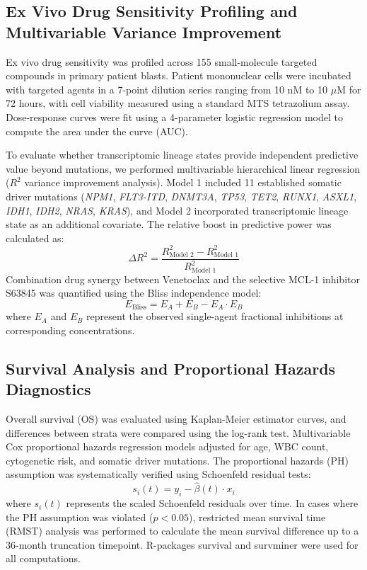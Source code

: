 \documentclass[11pt,a4paper]{article}
\begin{document}
\subsection{Ex Vivo Drug Sensitivity Profiling and Multivariable Variance Improvement}
Ex vivo drug sensitivity was profiled across 155 small-molecule targeted compounds in primary patient blasts. Patient mononuclear cells were incubated with targeted agents in a 7-point dilution series ranging from 10 nM to 10 $\mu$M for 72 hours, with cell viability measured using a standard MTS tetrazolium assay. Dose-response curves were fit using a 4-parameter logistic regression model to compute the area under the curve (AUC).

To evaluate whether transcriptomic lineage states provide independent predictive value beyond mutations, we performed multivariable hierarchical linear regression ($R^2$ variance improvement analysis). Model 1 included 11 established somatic driver mutations (\textit{NPM1}, \textit{FLT3-ITD}, \textit{DNMT3A}, \textit{TP53}, \textit{TET2}, \textit{RUNX1}, \textit{ASXL1}, \textit{IDH1}, \textit{IDH2}, \textit{NRAS}, \textit{KRAS}), and Model 2 incorporated transcriptomic lineage state as an additional covariate. The relative boost in predictive power was calculated as:
\begin{equation}
\Delta R^2 = \frac{R^2_{\text{Model 2}} - R^2_{\text{Model 1}}}{R^2_{\text{Model 1}}}
\end{equation}
Combination drug synergy between Venetoclax and the selective MCL-1 inhibitor S63845 was quantified using the Bliss independence model:
\begin{equation}
E_{\text{Bliss}} = E_A + E_B - E_A \cdot E_B
\end{equation}
where $E_A$ and $E_B$ represent the observed single-agent fractional inhibitions at corresponding concentrations.

\subsection{Survival Analysis and Proportional Hazards Diagnostics}
Overall survival (OS) was evaluated using Kaplan-Meier estimator curves, and differences between strata were compared using the log-rank test. Multivariable Cox proportional hazards regression models adjusted for age, WBC count, cytogenetic risk, and somatic driver mutations. The proportional hazards (PH) assumption was systematically verified using Schoenfeld residual tests:
\begin{equation}
s_i(t) = y_i - \hat{\beta}(t) \cdot x_i
\end{equation}
where $s_i(t)$ represents the scaled Schoenfeld residuals over time. In cases where the PH assumption was violated ($p < 0.05$), restricted mean survival time (RMST) analysis was performed to calculate the mean survival difference up to a 36-month truncation timepoint. R-packages survival and survminer were used for all computations.
\end{document}
